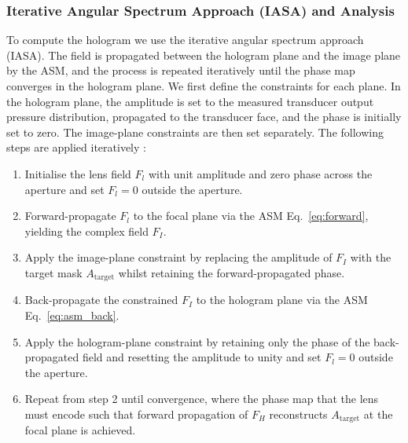 \documentclass[11pt,a4paper]{article}
\begin{document}
\subsubsection{Iterative Angular Spectrum Approach (IASA) and Analysis}
\label{sec:IASA}

To compute the hologram we use the iterative angular spectrum approach (IASA). The field is propagated between the hologram plane and the image plane by the ASM, and the process is repeated iteratively until the phase map converges in the hologram plane. We first define the constraints for each plane. In the hologram plane, the amplitude is set to the measured transducer output pressure distribution, propagated to the transducer face, and the phase is initially set to zero. The image-plane constraints are then set separately.
\noindent The following steps are applied iteratively \cite{melde2016holograms}:

\begin{enumerate}
    \item Initialise the lens field $F_l$ with unit amplitude and zero phase 
          across the aperture and set $F_l = 0$ outside the aperture.
    \item Forward-propagate $F_l$ to the focal plane via the ASM 
          Eq.~\ref{eq:forward}, yielding the complex field $F_I$.
    \item Apply the image-plane constraint by replacing the amplitude of 
          $F_I$ with the target mask $A_\text{target}$ whilst retaining 
          the forward-propagated phase. 
    \item Back-propagate the constrained $F_I$ to the hologram plane via 
          the ASM Eq.~\ref{eq:asm_back}.
    \item Apply the hologram-plane constraint by retaining only the phase 
          of the back-propagated field and resetting the amplitude to unity and set $F_l = 0$ outside the aperture.
    \item Repeat from step 2 until convergence, where the phase map that the lens must encode such        that forward propagation of $F_H$ reconstructs $A_\text{target}$ at the focal plane is          achieved. 
\end{enumerate}
\end{document}
